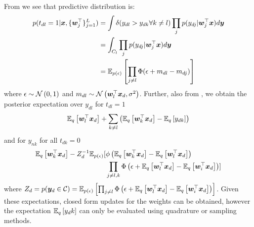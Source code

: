 From \cite{Girolami2007} we see that predictive distribution is:
\begin{equation}
\begin{aligned}
p(t_{dl} = 1 | \vv{x}, \{ \vv{w}_j\T \}_{j=1}^L) & =
\int \delta (y_{dl} > y_{dk} \forall k \neq l) \prod_j p(y_{dj} | \vv{w}_j\T\vv{x}) d\vv{y} \\
&= \int_{C_l} \prod_j p(y_{dj} | \vv{w}_j\T\vv{x}) d\vv{y} \\
&= \ex{\prod_{j \neq l} \Phi(\epsilon + m_{dl} - m_{dj})}{p(\epsilon)}
\end{aligned}
\end{equation}
where $\epsilon \sim \nor{0}{1}$ and $m_{dl} \sim \nor{\vv{w}_l\T\vv{x}_d}{\sigma^2}$. Further, also from \cite{Girolami2007}, we obtain the posterior expectation over $y_{dl}$ for $t_{dl} = 1$
\begin{align}
\ex{\vv{w}_l\T\vv{x}_d}{q} + \sum_{k \neq l} \left(\ex{\vv{w}_k\T\vv{x}_d}{q} - \ex{y_{dk}}{q}\right)
\end{align}
and for $y_{nk}$ for all $t_{dk} = 0$
\begin{align}
\begin{split}
\ex{\vv{w}_k\T\vv{x}_d}{q}
 - Z_d^{-1}\mathbb{E}_{p(\epsilon)} [ & \phi\left(\ex{\vv{w}_k\T\vv{x}_d}{q} - \ex{\vv{w}_l\T\vv{x}_d}{q} \right) \\
 & \prod_{j \neq l,k}\Phi\left(\epsilon + \ex{\vv{w}_l\T\vv{x}_d}{q} - \ex{\vv{w}_i\T\vv{x}_d}{q} \right) ]
\end{split}
\end{align}
where $Z_d = p(\vv{y}_d \in \mathcal{C}) = \ex{\prod_{j \neq l}\Phi\left(\epsilon + \ex{\vv{w}_l\T\vv{x}_d}{q} - \ex{\vv{w}_i\T\vv{x}_d}{q} \right) }{p(\epsilon)}$. Given these expectations, closed form updates for the weights can be obtained, however the expectation $\ex{y_dk}{q}$ can only be evaluated using quadrature or sampling methods.





